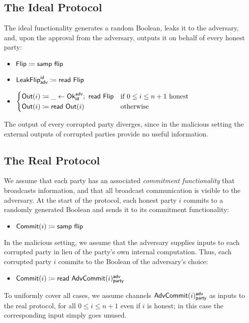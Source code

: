 \subsection{The Ideal Protocol}
The ideal functionality generates a random Boolean, leaks it to the adversary, and, upon the approval from the adversary, outputs it on behalf of every honest party:
\begin{itemize}
\item $\mathsf{Flip} \coloneqq \mathsf{samp} \ \mathsf{flip}$
\item $\mathsf{LeakFlip}^{\mathsf{id}}_{\mathsf{adv}} \coloneqq \mathsf{read} \ \mathsf{Flip}$
\item $\begin{cases*} \Out(i) \coloneqq \_ \leftarrow \Ok^\adv_\id; \ \read{\Flip} & \text{if $0 \leq i \leq n+1$ honest} \\ \Out(i) \coloneqq \read{\Out(i)} & \text{otherwise} \end{cases*}$
\end{itemize}
The output of every corrupted party diverges, since in the malicious setting the external outputs of corrupted parties provide no useful information.

\subsection{The Real Protocol}
We assume that each party has an associated \emph{commitment functionality} that broadcasts information, and that all broadcast communication is visible to the adversary. At the start of the protocol, each honest party $i$ commits to a randomly generated Boolean and sends it to its commitment functionality:
\begin{itemize}
\item {\color{blue} $\mathsf{Commit}(i) \coloneqq \mathsf{samp} \ \mathsf{flip}$}
\end{itemize}
In the malicious setting, we assume that the adversary supplies inputs to each corrupted party in lieu of the party's own internal computation. Thus, each corrupted party $i$ commits to the Boolean of the adversary's choice:
\begin{itemize}
\item {\color{blue} $\mathsf{Commit}(i) \coloneqq \mathsf{read} \ \mathsf{AdvCommit}(i)^{\mathsf{adv}}_{\mathsf{party}}$}
\end{itemize}
To uniformly cover all cases, we assume channels $\mathsf{AdvCommit}(i)^{\mathsf{adv}}_{\mathsf{party}}$ as inputs to the real protocol, for all $0 \leq i \leq n+1$ even if $i$ is honest; in this case the corresponding input simply goes unused.

